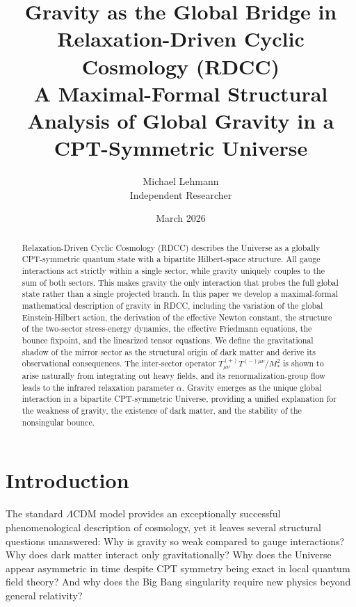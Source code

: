\documentclass[11pt,a4paper]{article}
\title{\textbf{Gravity as the Global Bridge in Relaxation-Driven Cyclic Cosmology (RDCC)}\\
\vspace{0.3cm}
\large A Maximal-Formal Structural Analysis of Global Gravity in a CPT-Symmetric Universe}
\author{Michael Lehmann \\ Independent Researcher}
\date{March 2026}
\begin{document}
\maketitle

\begin{abstract}
Relaxation-Driven Cyclic Cosmology (RDCC) describes the Universe as a globally CPT-symmetric quantum state with a bipartite Hilbert-space structure. All gauge interactions act strictly within a single sector, while gravity uniquely couples to the sum of both sectors. This makes gravity the only interaction that probes the full global state rather than a single projected branch. In this paper we develop a maximal-formal mathematical description of gravity in RDCC, including the variation of the global Einstein-Hilbert action, the derivation of the effective Newton constant, the structure of the two-sector stress-energy dynamics, the effective Friedmann equations, the bounce fixpoint, and the linearized tensor equations. We define the gravitational shadow of the mirror sector as the structural origin of dark matter and derive its observational consequences. The inter-sector operator $T^{(+)}_{\mu\nu} T^{(-)\mu\nu}/M_*^2$ is shown to arise naturally from integrating out heavy fields, and its renormalization-group flow leads to the infrared relaxation parameter $\alpha$. Gravity emerges as the unique global interaction in a bipartite CPT-symmetric Universe, providing a unified explanation for the weakness of gravity, the existence of dark matter, and the stability of the nonsingular bounce.
\end{abstract}

\tableofcontents
\newpage

\section{Introduction}

The standard $\Lambda$CDM model provides an exceptionally successful phenomenological description of cosmology, yet it leaves several structural questions unanswered: Why is gravity so weak compared to gauge interactions? Why does dark matter interact only gravitationally? Why does the Universe appear asymmetric in time despite CPT symmetry being exact in local quantum field theory? And why does the Big Bang singularity require new physics beyond general relativity?
\end{document}
